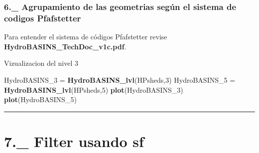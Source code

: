 \documentclass[]{article}
\newenvironment{Shaded}{\begin{snugshade}}{\end{snugshade}}
\newcommand{\KeywordTok}[1]{\textcolor[rgb]{0.13,0.29,0.53}{\textbf{#1}}}
\newcommand{\DataTypeTok}[1]{\textcolor[rgb]{0.13,0.29,0.53}{#1}}
\newcommand{\DecValTok}[1]{\textcolor[rgb]{0.00,0.00,0.81}{#1}}
\newcommand{\StringTok}[1]{\textcolor[rgb]{0.31,0.60,0.02}{#1}}
\newcommand{\ControlFlowTok}[1]{\textcolor[rgb]{0.13,0.29,0.53}{\textbf{#1}}}
\newcommand{\OperatorTok}[1]{\textcolor[rgb]{0.81,0.36,0.00}{\textbf{#1}}}
\newcommand{\NormalTok}[1]{#1}
\begin{document}
\subsubsection{6.\_ Agrupamiento de las geometrias según el sistema de
codigos
Pfafstetter}\label{agrupamiento-de-las-geometrias-segun-el-sistema-de-codigos-pfafstetter}

Para entender el sistema de códigos Pfafstetter revise
\textbf{\textbf{HydroBASINS\_TechDoc\_v1c.pdf}}.

\begin{Shaded}
\end{Shaded}

 Vizualizacion del nivel 3

\begin{Shaded}
\begin{Highlighting}[]
\NormalTok{HydroBASINS_}\DecValTok{3}\NormalTok{ =}\StringTok{ }\KeywordTok{HydroBASINS_lvl}\NormalTok{(HPsheds,}\DecValTok{3}\NormalTok{)}
\NormalTok{HydroBASINS_}\DecValTok{5}\NormalTok{ =}\StringTok{ }\KeywordTok{HydroBASINS_lvl}\NormalTok{(HPsheds,}\DecValTok{5}\NormalTok{)}
\KeywordTok{plot}\NormalTok{(HydroBASINS_}\DecValTok{3}\NormalTok{)}
\KeywordTok{plot}\NormalTok{(HydroBASINS_}\DecValTok{5}\NormalTok{)}
\end{Highlighting}
\end{Shaded}

\begin{center}\rule{0.5\linewidth}{\linethickness}\end{center}

\section{\texorpdfstring{7.\_ Filter usando
\textbf{sf}}{7.\_ Filter usando sf}}\label{filter-usando-sf}
\end{document}
